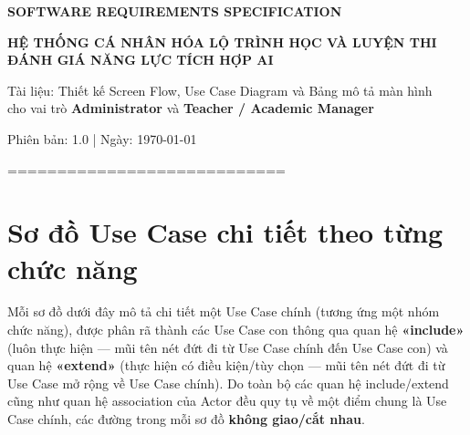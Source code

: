 \documentclass[11pt,a4paper]{article}
\begin{document}
	
	\begin{titlepage}
		\centering
		\vspace*{1.5cm}
		{\headingfont\Huge\bfseries\color{primaryblue} SOFTWARE REQUIREMENTS SPECIFICATION\par}
		\vspace{0.6cm}
		{\headingfont\Large\bfseries HỆ THỐNG CÁ NHÂN HÓA LỘ TRÌNH HỌC VÀ LUYỆN THI\\ĐÁNH GIÁ NĂNG LỰC TÍCH HỢP AI\par}
		\vspace{1.5cm}
		{\large Tài liệu: Thiết kế Screen Flow, Use Case Diagram và Bảng mô tả màn hình\\cho vai trò \textbf{Administrator} và \textbf{Teacher / Academic Manager}\par}
		\vspace{2cm}
		
		
		\vfill
		{\large Phiên bản: 1.0 \quad | \quad Ngày: \today\par}
	\end{titlepage}
	
	\tableofcontents
	\clearpage
	
	============================
	\section{Sơ đồ Use Case chi tiết theo từng chức năng}
	
	Mỗi sơ đồ dưới đây mô tả chi tiết một Use Case chính (tương ứng một nhóm chức năng),
	được phân rã thành các Use Case con thông qua quan hệ \textbf{«include»}
	(luôn thực hiện — mũi tên nét đứt đi từ Use Case chính đến Use Case con) và quan hệ
	\textbf{«extend»} (thực hiện có điều kiện/tùy chọn — mũi tên nét đứt đi
	từ Use Case mở rộng về Use Case chính). Do toàn bộ các quan hệ include/extend cũng như quan hệ
	association của Actor đều quy tụ về một điểm chung là Use Case chính, các đường trong mỗi sơ đồ
	\textbf{không giao/cắt nhau}.
	
\end{document}
